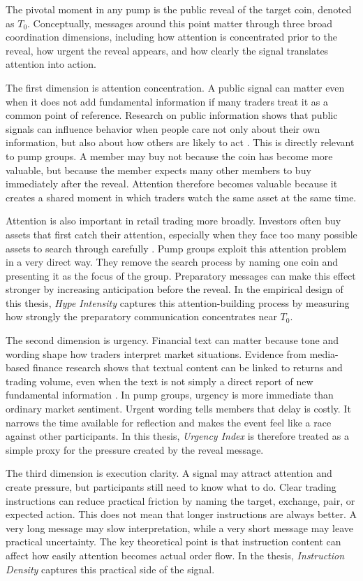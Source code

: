 The pivotal moment in any pump is the public reveal of the target coin, denoted as $T_0$. Conceptually, messages around this point matter through three broad coordination dimensions, including how attention is concentrated prior to the reveal, how urgent the reveal appears, and how clearly the signal translates attention into action.

The first dimension is attention concentration. A public signal can matter even when it does not add fundamental information if many traders treat it as a common point of reference. Research on public information shows that public signals can influence behavior when people care not only about their own information, but also about how others are likely to act \cite{morris2002social}. This is directly relevant to pump groups. A member may buy not because the coin has become more valuable, but because the member expects many other members to buy immediately after the reveal. Attention therefore becomes valuable because it creates a shared moment in which traders watch the same asset at the same time.

Attention is also important in retail trading more broadly. Investors often buy assets that first catch their attention, especially when they face too many possible assets to search through carefully \cite{barber2008all}. Pump groups exploit this attention problem in a very direct way. They remove the search process by naming one coin and presenting it as the focus of the group. Preparatory messages can make this effect stronger by increasing anticipation before the reveal. In the empirical design of this thesis, \textit{Hype Intensity} captures this attention-building process by measuring how strongly the preparatory communication concentrates near $T_0$.

The second dimension is urgency. Financial text can matter because tone and wording shape how traders interpret market situations. Evidence from media-based finance research shows that textual content can be linked to returns and trading volume, even when the text is not simply a direct report of new fundamental information \cite{tetlock2007giving}. In pump groups, urgency is more immediate than ordinary market sentiment. Urgent wording tells members that delay is costly. It narrows the time available for reflection and makes the event feel like a race against other participants. In this thesis, \textit{Urgency Index} is therefore treated as a simple proxy for the pressure created by the reveal message.

The third dimension is execution clarity. A signal may attract attention and create pressure, but participants still need to know what to do. Clear trading instructions can reduce practical friction by naming the target, exchange, pair, or expected action. This does not mean that longer instructions are always better. A very long message may slow interpretation, while a very short message may leave practical uncertainty. The key theoretical point is that instruction content can affect how easily attention becomes actual order flow. In the thesis, \textit{Instruction Density} captures this practical side of the signal.

